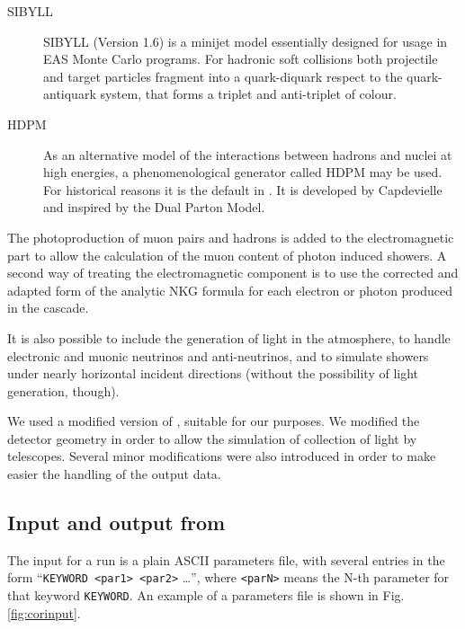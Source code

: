 \begin{itemize}
\begin{description}
\item[SIBYLL] SIBYLL (Version 1.6) is a minijet model essentially
  designed for usage in EAS Monte Carlo programs. For hadronic soft
  collisions both projectile and target particles fragment into a
  quark-diquark respect to the quark-antiquark system, that forms a
  triplet and anti-triplet of colour.
  
\item[HDPM] As an alternative model of the interactions between
  hadrons and nuclei at high energies, a phenomenological generator
  called HDPM may be used. For historical reasons it is the default in
  \CORSIKA.  It is developed by Capdevielle \cite{Capdevielle:1989}
  and inspired by the Dual Parton Model\cite{Capella:1980}.
\end{description}

\end{itemize}

The photoproduction of muon pairs and hadrons is added to the
electromagnetic part to allow the calculation of the muon content of
photon induced showers. A second way of treating the electromagnetic
component is to use the corrected and adapted form of the analytic NKG
formula for each electron or photon produced in the cascade.

It is also possible to include the generation of \Cherenkov light in
the atmosphere, to handle electronic and muonic neutrinos and
anti-neutrinos, and to simulate showers under nearly horizontal
incident directions (without the possibility of \Cherenkov light
generation, though).

We used a modified version of , suitable for our purposes.
We modified the detector geometry in order to allow the simulation of
collection of light by \Cherenkov telescopes. Several minor
modifications were also introduced in order to make easier the
handling of the output data.

\subsection{Input and output from \CORSIKA}
%
The input for a \CORSIKA run is a plain ASCII parameters file, with
several entries in the form ``\texttt{KEYWORD <par1> <par2>} \ldots'',
where \texttt{<parN>} means the N-th parameter for that keyword
\texttt{KEYWORD}. An example of a parameters file is shown in Fig.
\ref{fig:corinput}.

\CORSIKAinputfig

\afterpage{\clearpage}

